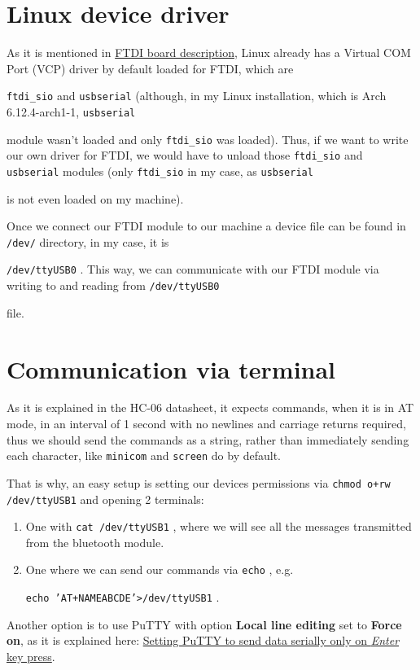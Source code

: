 \documentclass[12pt]{book}
\newcommand{\code}[1]{
    {\color{blue}\texttt{#1}}
}
\begin{document}
\section{Linux device driver}
As it is mentioned in 
\href{https://www.digitec.ch/en/s1/product/deek-robot-dk-ftdi-isp-breakout-335v-power-component-electronics-modules-5997850}{
FTDI board description}, Linux already has a Virtual COM Port (VCP) driver by default loaded for FTDI, which are 
\code{ftdi\_sio} and \code{usbserial} (although, in my Linux installation, which is Arch 6.12.4-arch1-1, \code{usbserial} 
module wasn't loaded and only \code{ftdi\_sio} was loaded). Thus, if we want to write our own driver for FTDI, we would 
have to unload those \code{ftdi\_sio} and \code{usbserial} modules (only \code{ftdi\_sio} in my case, as \code{usbserial}
is not even loaded on my machine).

Once we connect our FTDI module to our machine a device file can be found in \code{/dev/} directory, in my case, it is 
\code{/dev/ttyUSB0}. This way, we can communicate with our FTDI module via writing to and reading from \code{/dev/ttyUSB0}
file.

\section{Communication via terminal}
As it is explained in the HC-06 datasheet, it expects commands, when it is in AT mode, in an interval of 1 second with 
no newlines and carriage returns required, thus we should send the commands as a string, rather than immediately sending
each character, like \code{minicom} and \code{screen} do by default.

That is why, an easy setup is setting our devices permissions via \code{chmod o+rw /dev/ttyUSB1} and opening 2 terminals:
\begin{enumerate}
    \item One with \code{cat /dev/ttyUSB1}, where we will see all the messages transmitted from the bluetooth module.
    \item One where we can send our commands via \code{echo}, e.g. 
    
        \code{echo 'AT+NAMEABCDE'>/dev/ttyUSB1}.
\end{enumerate}

Another option is to use PuTTY with option \textbf{Local line editing} set to \textbf{Force on}, as it is explained here:
\href{https://stackoverflow.com/questions/4999280/how-to-send-characters-in-putty-serial-communication-only-when-pressing-enter}{
Setting PuTTY to send data serially only on \emph{Enter} key press}.
\end{document}
